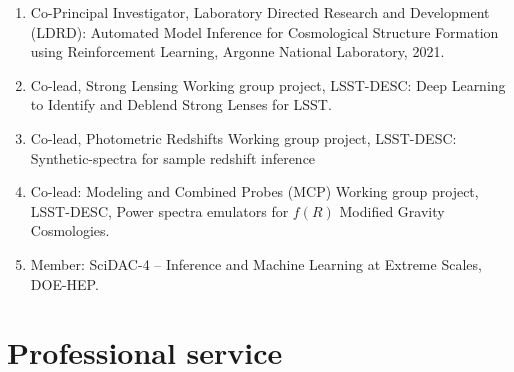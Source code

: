 \documentclass[letterpaper]{article}
\begin{document}
\begin{enumerate}
\item Co-Principal Investigator, Laboratory Directed Research and Development (LDRD): Automated Model Inference for Cosmological Structure Formation using Reinforcement Learning, Argonne National Laboratory, 2021. 
  
\item Co-lead, Strong Lensing Working group project, LSST-DESC: Deep Learning to Identify and Deblend Strong Lenses for LSST. 

\item Co-lead, Photometric Redshifts Working group project, LSST-DESC: Synthetic-spectra for sample redshift inference  
  
\item Co-lead: Modeling and Combined Probes (MCP) Working group project, LSST-DESC, Power spectra emulators for $f(R)$ Modified Gravity Cosmologies.
  
\item Member: SciDAC-4 -- Inference and Machine Learning at Extreme Scales, DOE-HEP.


\end{enumerate}


\section*{Professional service}
\end{document}
